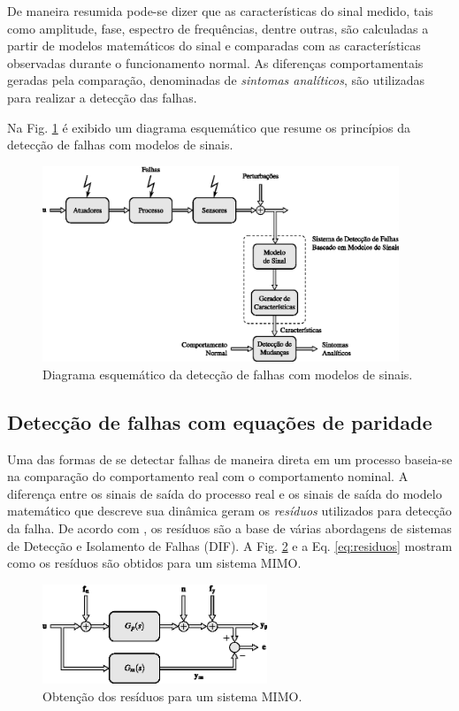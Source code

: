 De maneira resumida pode-se dizer que as características do sinal medido, tais
como amplitude, fase, espectro de frequências, dentre outras, são calculadas a
partir de modelos matemáticos do sinal e comparadas com as características
observadas durante o funcionamento normal. As diferenças comportamentais geradas
pela comparação, denominadas de {\it sintomas analíticos}, são utilizadas para
realizar a detecção das falhas.

Na Fig. \ref{fig:detec_mod_sin} é exibido um diagrama esquemático que resume os
princípios da detecção de falhas com modelos de sinais.

\begin{figure}[htb]
\centering
    \includegraphics[width=0.95\textwidth]{imgs/detec_diag/eps/detec_mod_sin}
    \caption{Diagrama esquemático da detecção de falhas com modelos de sinais.}
    \label{fig:detec_mod_sin}
\end{figure}

\subsection{Detecção de falhas com equações de paridade}
Uma das formas de se detectar falhas de maneira direta em um processo baseia-se
na comparação do comportamento real com o comportamento nominal. A diferença
entre os sinais de saída do processo real e os sinais de saída do modelo
matemático que descreve sua dinâmica geram os {\it resíduos} utilizados para
detecção da falha. De acordo com , os resíduos são a base
de várias abordagens de sistemas de Detecção e Isolamento de Falhas (DIF). A
Fig. \ref{fig:residuos} e a Eq. \ref{eq:residuos} mostram como os resíduos são
obtidos para um sistema MIMO.

\begin{figure}[htb]
\centering
    \includegraphics[width=0.6\textwidth]{imgs/detec_diag/eps/residuos}
    \caption{Obtenção dos resíduos para um sistema MIMO.}
    \label{fig:residuos}
\end{figure}

